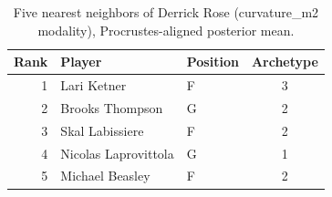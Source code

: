 \begin{table}[htbp]
  \centering\small
  \begin{tabular}{rllc}
    \toprule
    Rank & Player & Position & Archetype \\
    \midrule
    1 & Lari Ketner & F & 3 \\
    2 & Brooks Thompson & G & 2 \\
    3 & Skal Labissiere & F & 2 \\
    4 & Nicolas Laprovittola & G & 1 \\
    5 & Michael Beasley & F & 2 \\
    \bottomrule
  \end{tabular}
  \caption{Five nearest neighbors of Derrick Rose (curvature_m2 modality), Procrustes-aligned posterior mean.}
  \label{tab:Derrick_Rose_neighbors_curvature_m2}
\end{table}

